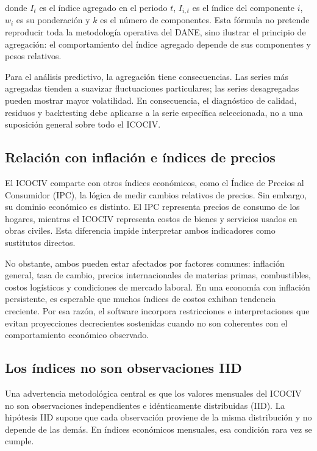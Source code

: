donde \(I_t\) es el índice agregado en el periodo \(t\), \(I_{i,t}\) es el índice del componente \(i\), \(w_i\) es su ponderación y \(k\) es el número de componentes. Esta fórmula no pretende reproducir toda la metodología operativa del DANE, sino ilustrar el principio de agregación: el comportamiento del índice agregado depende de sus componentes y pesos relativos.

Para el análisis predictivo, la agregación tiene consecuencias. Las series más agregadas tienden a suavizar fluctuaciones particulares; las series desagregadas pueden mostrar mayor volatilidad. En consecuencia, el diagnóstico de calidad, residuos y backtesting debe aplicarse a la serie específica seleccionada, no a una suposición general sobre todo el ICOCIV.

\subsection{Relación con inflación e índices de precios}

El ICOCIV comparte con otros índices económicos, como el Índice de Precios al Consumidor (IPC), la lógica de medir cambios relativos de precios. Sin embargo, su dominio económico es distinto. El IPC representa precios de consumo de los hogares, mientras el ICOCIV representa costos de bienes y servicios usados en obras civiles. Esta diferencia impide interpretar ambos indicadores como sustitutos directos.

No obstante, ambos pueden estar afectados por factores comunes: inflación general, tasa de cambio, precios internacionales de materias primas, combustibles, costos logísticos y condiciones de mercado laboral. En una economía con inflación persistente, es esperable que muchos índices de costos exhiban tendencia creciente. Por esa razón, el software incorpora restricciones e interpretaciones que evitan proyecciones decrecientes sostenidas cuando no son coherentes con el comportamiento económico observado.

\subsection{Los índices no son observaciones IID}

Una advertencia metodológica central es que los valores mensuales del ICOCIV no son observaciones independientes e idénticamente distribuidas (IID). La hipótesis IID supone que cada observación proviene de la misma distribución y no depende de las demás. En índices económicos mensuales, esa condición rara vez se cumple.

